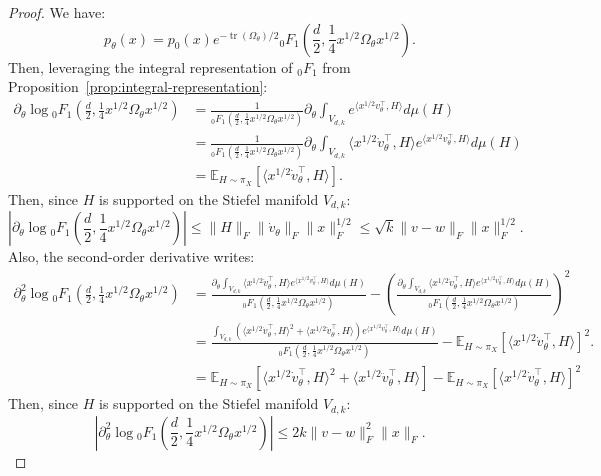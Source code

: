 \documentclass{article}
\theoremstyle{plain}
\theoremstyle{definition}
\theoremstyle{remark}
\DeclareMathOperator{\tr}{tr}
\begin{document}
\begin{proof}
    We have:
    \[p_\theta(x) = p_0(x) e^{- \tr(\Omega_\theta)/2} {}_0F_1\left(\frac{d}{2}, \frac{1}{4}x^{1/2} \Omega_\theta x^{1/2}\right).\]
    Then, leveraging the integral representation of ${}_0F_1$ from Proposition~\ref{prop:integral-representation}:
    \begin{align*}
        \partial_\theta \log {}_0F_1\left(\frac{d}{2}, \frac{1}{4}x^{1/2} \Omega_\theta x^{1/2}\right) &= \frac{1}{{}_0F_1\left(\frac{d}{2}, \frac{1}{4}x^{1/2} \Omega_\theta x^{1/2}\right) }\partial_\theta \int_{V_{d,k}} e^{\langle x^{1/2} v_\theta^\top, H\rangle} d\mu(H)\\
        &= \frac{1}{{}_0F_1\left(\frac{d}{2}, \frac{1}{4}x^{1/2} \Omega_\theta x^{1/2}\right) }\partial_\theta \int_{V_{d,k}}\langle x^{1/2} \dot v_\theta^\top, H\rangle e^{\langle x^{1/2} v_\theta^\top, H\rangle} d\mu(H)\\
        &= \mathbb{E}_{H \sim \pi_X}[\langle x^{1/2} \dot v_\theta^\top, H\rangle].
    \end{align*}
    Then, since $H$ is supported on the Stiefel manifold $V_{d,k}$:
    \[\left|\partial_\theta \log {}_0F_1\left(\frac{d}{2}, \frac{1}{4}x^{1/2} \Omega_\theta x^{1/2}\right)\right| \leq \|H\|_F\|\dot v_\theta\|_F\|x\|_F^{1/2}  \leq \sqrt{k}\|v-w\|_{F} \|x\|_F^{1/2}.\]
    Also, the second-order derivative writes:
    \begin{align*}
        \partial_\theta^2 \log {}_0F_1\left(\frac{d}{2}, \frac{1}{4}x^{1/2} \Omega_\theta x^{1/2}\right) &= \frac{\partial_\theta \int_{V_{d,k}}\langle x^{1/2} \dot v_\theta^\top, H\rangle e^{\langle x^{1/2} v_\theta^\top, H\rangle} d\mu(H)}{{}_0F_1\left(\frac{d}{2}, \frac{1}{4}x^{1/2} \Omega_\theta x^{1/2}\right)} - \left(\frac{\partial_\theta \int_{V_{d,k}}\langle x^{1/2} \dot v_\theta^\top, H\rangle e^{\langle x^{1/2} v_\theta^\top, H\rangle} d\mu(H)}{{}_0F_1\left(\frac{d}{2}, \frac{1}{4}x^{1/2} \Omega_\theta x^{1/2}\right)}\right)^2\\
        &= \frac{\int_{V_{d,k}}\left(\langle x^{1/2} \dot v_\theta^\top, H\rangle^2 + \langle x^{1/2} \ddot v_\theta^\top, H\rangle\right) e^{\langle x^{1/2} v_\theta^\top, H\rangle} d\mu(H)}{{}_0F_1\left(\frac{d}{2}, \frac{1}{4}x^{1/2} \Omega_\theta x^{1/2}\right)} - \mathbb{E}_{H \sim \pi_X}[\langle x^{1/2} \dot v_\theta^\top, H\rangle]^2.\\
        &= \mathbb{E}_{H \sim \pi_X}[\langle x^{1/2} \dot v_\theta^\top, H\rangle^2 + \langle x^{1/2} \ddot v_\theta^\top, H\rangle] - \mathbb{E}_{H \sim \pi_X}[\langle x^{1/2} \dot v_\theta^\top, H\rangle]^2
    \end{align*}
    Then, since $H$ is supported on the Stiefel manifold $V_{d,k}$:
    \[\left|\partial_\theta^2 \log {}_0F_1\left(\frac{d}{2}, \frac{1}{4}x^{1/2} \Omega_\theta x^{1/2}\right)\right| \leq 2k \|v-w\|_F^2 \|x\|_F.\]
    
\end{proof}
\end{document}
